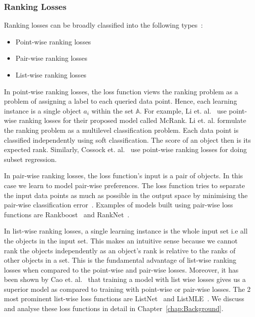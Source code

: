 \documentclass[12pt, twoside, ngerman]{report}
\begin{document}
\subsubsection{Ranking Losses}
\label{sec:ranklearning}

Ranking losses can be broadly classified into the following types~\cite{RankingLossFirstPaperRead}:
\begin{itemize}
\item  Point-wise ranking losses
\item  Pair-wise ranking losses
\item  List-wise ranking losses
\end{itemize}

In point-wise ranking losses,  the loss function views the ranking problem as a problem of assigning a label to each queried data point.
Hence,  each learning instance is a single object $a_i$ within the set $\mathbb{A}$.
For example,  Li et. al.~\cite{McRank} use point-wise ranking losses for their proposed model called McRank.
Li et.  al.  formulate the ranking problem as a multilevel classification problem.
Each data point is classified independently using soft classification.
The score of an object then is its expected rank.
Similarly,  Cossock et.  al.~\cite{subsetregressionpaper} use point-wise ranking losses for doing subset regression. 

In pair-wise ranking losses,  the loss function's input is a pair of objects.
In this case we learn to model pair-wise preferences.
The loss function tries to separate the input data points as much as possible in the output space by minimising the pair-wise classification error~\cite{pairwisepreferencespaper}.
Examples of models built using pair-wise loss functions are Rankboost~\cite{rankboostpaper} and RankNet~\cite{ranknetpaper}.

In list-wise ranking losses,  a single learning instance is the whole input set i.e all the objects in the input set.
This makes an intuitive sense because we cannot rank the objects independently as an object's rank is relative to the ranks of other objects in a set.
This is the fundamental advantage of list-wise ranking losses when compared to the point-wise and pair-wise losses.
Moreover,  it has been shown by Cao et. al.~\cite{listwisebetter} that training a model with list wise losses gives us a superior model as compared to training with point-wise or pair-wise losses.
The 2 most prominent list-wise loss functions are ListNet~\cite{listwisebetter} and ListMLE~\cite{listmlepaper}.
We discuss and analyse these loss functions in detail in Chapter~\ref{chap:Background}.
\end{document}
